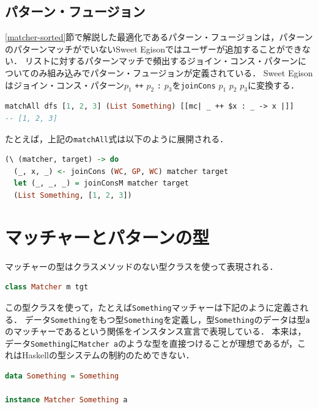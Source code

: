 \subsection{パターン・フュージョン}

\ref{matcher-sorted}節で解説した最適化であるパターン・フュージョンは，パターンのパターンマッチがでいないSweet Egisonではユーザーが追加することができない．
リストに対するパターンマッチで頻出するジョイン・コンス・パターンについてのみ組み込みでパターン・フュージョンが定義されている．
Sweet Egisonはジョイン・コンス・パターン$p_{1}$ \lstinline{++} $p_{2}$ \lstinline{:} $p_{3}$を\lstinline{joinCons} $p_{1}$ $p_{2}$ $p_{3}$に変換する．
\begin{lstlisting}[language=haskell,numbers=none]
matchAll dfs [1, 2, 3] (List Something) [[mc| _ ++ $x : _ -> x |]]
-- [1, 2, 3]
\end{lstlisting}
たとえば，上記の\lstinline{matchAll}式は以下のように展開される．
\begin{lstlisting}[language=haskell,numbers=none]
(\ (matcher, target) -> do
  (_, x, _) <- joinCons (WC, GP, WC) matcher target
  let (_, _, _) = joinConsM matcher target
  (List Something, [1, 2, 3])
\end{lstlisting}

\section{マッチャーとパターンの型}\label{sweet-type}

マッチャーの型はクラスメソッドのない型クラスを使って表現される．
\begin{lstlisting}[language=haskell,numbers=none]
class Matcher m tgt
\end{lstlisting}
この型クラスを使って，たとえば\lstinline{Something}マッチャーは下記のように定義される．
データ\lstinline{Something}をもつ型\lstinline{Something}を定義し，型\lstinline{Something}のデータは型\lstinline{a}のマッチャーであるという関係をインスタンス宣言で表現している．
本来は，データ\lstinline{Something}に\lstinline{Matcher a}のような型を直接つけることが理想であるが，これはHaskellの型システムの制約のためできない．
\begin{lstlisting}[language=haskell,numbers=none]
data Something = Something

instance Matcher Something a
\end{lstlisting}

